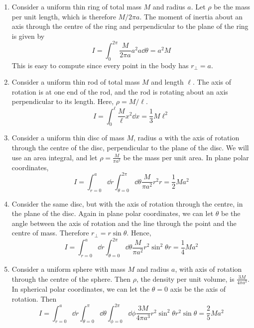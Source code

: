 \begin{enumerate}
	\item Consider a uniform thin ring of total mass \(M\) and radius \(a\).
	      Let \(\rho\) be the mass per unit length, which is therefore \(M/2\pi a\).
	      The moment of inertia about an axis through the centre of the ring and perpendicular to the plane of the ring is given by
	      \[
		      I = \int_0^{2\pi} \frac{M}{2\pi a} a^2 a \dd{\theta} = a^2 M
	      \]
	      This is easy to compute since every point in the body has \(r_\perp = a\).
	\item Consider a uniform thin rod of total mass \(M\) and length \(\ell\).
	      The axis of rotation is at one end of the rod, and the rod is rotating about an axis perpendicular to its length.
	      Here, \(\rho = M/\ell\).
	      \[
		      I = \int_0^\ell \frac{M}{\ell} x^2 \dd{x} = \frac{1}{3}M\ell^2
	      \]
	\item Consider a uniform thin disc of mass \(M\), radius \(a\) with the axis of rotation through the centre of the disc, perpendicular to the plane of the disc.
	      We will use an area integral, and let \(\rho = \frac{M}{\pi a^2}\) be the mass per unit area.
	      In plane polar coordinates,
	      \[
		      I = \int_{r=0}^a \dd{r} \int_{\theta = 0}^{2 \pi} \dd{\theta} \frac{M}{\pi a^2} r^2 r = \frac{1}{2}Ma^2
	      \]
	\item Consider the same disc, but with the axis of rotation through the centre, in the plane of the disc.
	      Again in plane polar coordinates, we can let \(\theta\) be the angle between the axis of rotation and the line through the point and the centre of mass.
	      Therefore \(r_\perp = r\sin\theta\).
	      Hence,
	      \[
		      I = \int_{r=0}^a \dd{r} \int_{\theta = 0}^{2 \pi} \dd{\theta} \frac{M}{\pi a^2} r^2 \sin^2\theta r = \frac{1}{4}Ma^2
	      \]
	\item Consider a uniform sphere with mass \(M\) and radius \(a\), with axis of rotation through the centre of the sphere.
	      Then \(\rho\), the density per unit volume, is \(\frac{3M}{4\pi a^3}\).
	      In spherical polar coordinates, we can let the \(\theta = 0\) axis be the axis of rotation.
	      Then
	      \[
		      I = \int_{r=0}^a \dd{r} \int_{\theta = 0}^{\pi} \dd{\theta} \int_{\phi = 0}^{2 \pi} \dd{\phi} \frac{3M}{4\pi a^3} r^2 \sin^2 \theta r^2\sin\theta = \frac{2}{5}Ma^2
	      \]
\end{enumerate}

